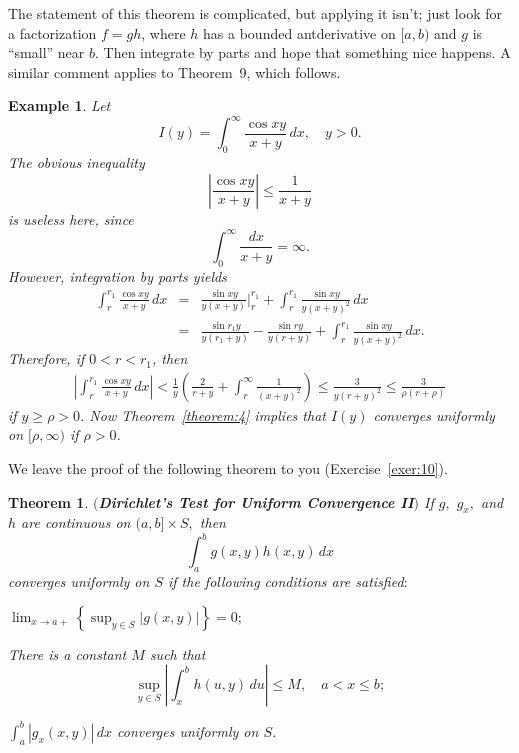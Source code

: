 \documentclass{article}
\newtheorem{theorem}{Theorem}
\newtheorem{example}{Example}
\newcommand{\dst}{\displaystyle}
\newcounter{lcal}
\newenvironment{alist}{\begin{list}{\bf (\alph{lcal})}
{\topsep 0pt\partopsep 0pt\labelwidth 14pt
\labelsep 8pt\leftmargin 22pt\itemsep 0pt
\usecounter{lcal}}}{\end{list}}
\begin{document}
The statement of this theorem is complicated, but applying it isn't;
just look for a factorization $f=gh$, where $h$ has a bounded
antderivative
  on $[a,b)$ and  $g$  is ``small'' near $b$. Then integrate by
parts and hope that something nice happens. A similar comment applies
to Theorem~9, which follows.




\begin{example}  \label{example:9}  \rm
Let
$$
I(y)=\int_{0}^{\infty}\frac{\cos xy}{x+y}\,dx,\quad y>0.
$$
The obvious inequality
$$
\left|\frac{\cos xy}{x+y}\right|\le \frac{1}{x+y}
$$
is useless here, since
$$
\int_{0}^{\infty}\frac{dx}{x+y}=\infty.
$$
However, integration by parts yields
\begin{eqnarray*}
\int_{r}^{r_{1}}\frac{\cos xy}{x+y}\,dx
&=& \frac{\sin xy}{y(x+y)}\biggr|_{r}^{r_{1}}+
\int_{r}^{r_{1}}\frac{\sin xy}{y(x+y)^{2}}\,dx\\
&=&\frac{\sin r_{1}y}{y(r_{1}+y)}-\frac{\sin ry}{y(r+y)}
+\int_{r}^{r_{1}}\frac{\sin xy}{y(x+y)^{2}}\,dx.
\end{eqnarray*}
Therefore, if $0< r<r_{1}$, then
\begin{eqnarray*}
\left|\int_{r}^{r_{1}}\frac{\cos xy}{x+y}\,dx\right|<
\frac{1}{y}\left(\frac{2}{r+y}+\int_{r}^{\infty}\frac{1}{(x+y)^{2}}\right)
\le \frac{3}{y(r+y)^{2}}\le \frac{3}{\rho(r+\rho)}
\end{eqnarray*}
if $y\ge \rho>0$. Now Theorem~\ref{theorem:4} implies that $I(y)$
converges uniformly on $[\rho,\infty)$ if $\rho>0$.
\end{example}

We leave the proof of the following theorem to you (Exercise~\ref{exer:10}).
\begin{theorem}  \label{theorem:9}
$(${\bf Dirichlet's Test for Uniform Convergence II}$)$
If $g,$  $g_{x},$ and $h$ are continuous on $(a,b]\times S,$  then
$$
\int_{a}^{b}g(x,y)h(x,y)\,dx
$$
converges uniformly on   $S$ if  the following
conditions are satisfied$:$
\begin{alist}
\item %
$\dst{\lim_{x\to a+}\left\{\sup_{y\in S}|g(x,y)|\right\}=0};$
\item %
There is a constant $M$ such that
$$
\sup_{y\in S}\left|\int_{x}^{b}h(u,y)\,du\right| \le M, \quad
a< x\le b;
$$

\item %
$\int_{a}^{b}|g_{x}(x,y)|\,dx$   converges uniformly on $S$.
\end{alist}
\end{theorem}
\end{document}
